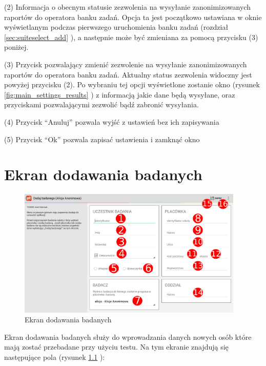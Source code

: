 \documentclass[a4paper,10pt,twosided]{book}
\newcommand{\refwithpage}[3]{
\ref{#1}\ifthenelse{\equal{\thepage}{\pageref{#1}}}{}{#2\pageref{#1}#3}%
}
\newcommand{\ppref}[1]{\refwithpage{#1}{ -- strona }{}}
\begin{document}
(2) Informacja o obecnym statusie zezwolenia na wysyłanie zanonimizowanych raportów do operatora banku zadań. Opcja ta jest początkowo ustawiana w oknie wyświetlanym podczas pierwszego uruchomienia banku zadań (rozdział \ppref{sec:suiteselect_add}), a następnie może być zmieniana za pomocą przycisku (3) poniżej.

(3) Przycisk pozwalający zmienić zezwolenie na wysyłanie zanonimizowanych raportów do operatora banku zadań. Aktualny status zezwolenia widoczny jest powyżej przycisku (2). Po wybraniu tej opcji wyświetlone zostanie okno (rysunek \ppref{fig:main_settings_results}) z informacją jakie dane będą wysyłane, oraz przyciskami pozwalającymi zezwolić bądź zabronić wysyłania.

(4) Przycisk ``Anuluj'' pozwala wyjść z ustawień bez ich zapisywania

(5) Przycisk ``Ok'' pozwala zapisać ustawienia i zamknąć okno

\chapter{Ekran dodawania badanych}
\label{chap:examineemgr}

\begin{figure}[b!]
\includegraphics[width=0.96\textwidth]{activity_examinee_manager.pdf}
\caption{Ekran dodawania badanych}
\label{fig:examineemgr}
\end{figure}

Ekran dodawania badanych służy do wprowadzania danych nowych osób które mają zostać przebadane przy użyciu testu. Na tym ekranie znajdują się następujące pola (rysunek \ppref{fig:examineemgr}):
\end{document}
